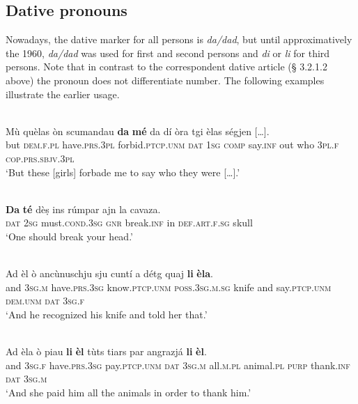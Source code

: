 \subsection{Dative pronouns}
Nowadays, the dative marker for all persons is \textit{da/dad}, but until approximatively the 1960, \textit{da/dad} was used for first and second persons and \textit{di} or \textit{li} for third persons. Note that in contrast to the correspondent dative article (§ 3.2.1.2 above) the pronoun does not differentiate number. The following examples illustrate the earlier usage. 

\ea
{}\\
\gll    Mù quèlas òn scumandau \textbf{da} \textbf{mé} da dí òra tgi èlas ségjen […].\\
     but \textsc{dem.f.pl} have.\textsc{prs.3pl} forbid.\textsc{ptcp.unm} \textsc{dat} \textsc{1sg} \textsc{comp} say.\textsc{inf} out who \textsc{3pl.f} \textsc{cop.prs.sbjv.3pl} \\
\glt `But these [girls] forbade me to say who they were […].'
\z

\ea
{}\\
\gll   \textbf{Da} \textbf{té} dèṣ ins rúmpar ajn la cavaza.\\
\textsc{dat} \textsc{2sg} must.\textsc{cond.3sg} \textsc{gnr} break.\textsc{inf} in \textsc{def.art.f.sg} skull\\
\glt `One should break your head.'
\z

\ea
{}\\
\gll  Ad èl ò ancùnuschju sju cuntí a détg quaj \textbf{li} \textbf{èla}. \\
 and 3\textsc{sg.m} have.\textsc{prs.3sg} know.\textsc{ptcp.unm}  \textsc{poss.3sg.m.sg} knife and say.\textsc{ptcp.unm} \textsc{dem.unm} \textsc{dat} \textsc{3sg.f}\\
\glt `And he recognized his knife and told her that.'
\z
 
\ea
{}\\
\gll  Ad èla ò piau \textbf{li} \textbf{èl} tùts tiars par angrazjá \textbf{li} \textbf{èl}.\\
     and 3\textsc{sg}.\textsc{f} have.\textsc{prs}.3\textsc{sg} pay.\textsc{ptcp.unm} \textsc{dat} 3\textsc{sg}.\textsc{m} all.\textsc{m}.\textsc{pl} animal.\textsc{pl} \textsc{purp} thank.\textsc{inf} \textsc{dat} 3\textsc{sg}.\textsc{m}\\
\glt `And she paid him all the animals in order to thank him.'
\z

